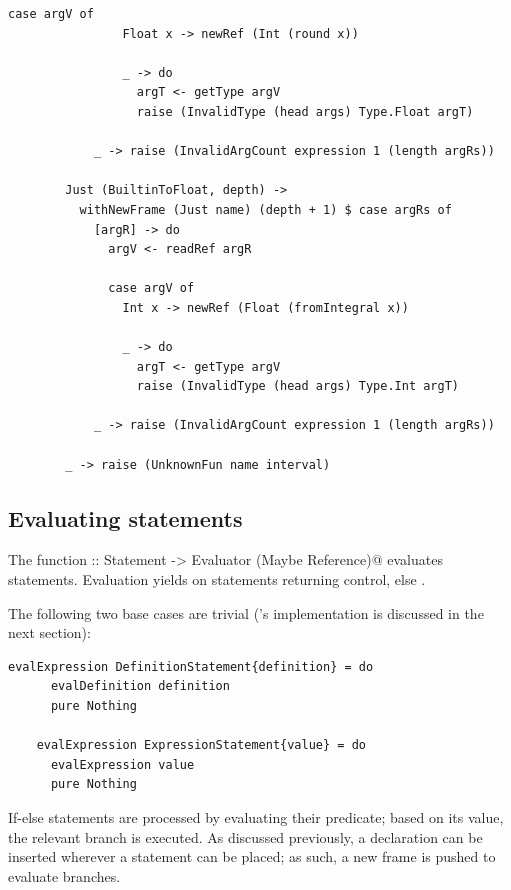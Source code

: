\documentclass[UdineBachThesis,american,11pt]{PhdThesis}
\begin{document}
  \newpage

  \begin{lstlisting}[gobble=4,basicstyle=\ttfamily\small]
              case argV of
                Float x -> newRef (Int (round x))

                _ -> do
                  argT <- getType argV
                  raise (InvalidType (head args) Type.Float argT)

            _ -> raise (InvalidArgCount expression 1 (length argRs))

        Just (BuiltinToFloat, depth) ->
          withNewFrame (Just name) (depth + 1) $ case argRs of
            [argR] -> do
              argV <- readRef argR

              case argV of
                Int x -> newRef (Float (fromIntegral x))

                _ -> do
                  argT <- getType argV
                  raise (InvalidType (head args) Type.Int argT)

            _ -> raise (InvalidArgCount expression 1 (length argRs))

        _ -> raise (UnknownFun name interval)
  \end{lstlisting}

  \subsection{Evaluating statements}

  The function
  \lstinline@evalStatement :: Statement -> Evaluator (Maybe Reference)@
  evaluates statements. Evaluation yields \lstinline@Just@ on statements
  returning control, else \lstinline@Nothing@.

  The following two base cases are trivial (\lstinline@evalDefinitions@'s
  implementation is discussed in the next section):

  \begin{lstlisting}[gobble=4,basicstyle=\ttfamily\small]
    evalExpression DefinitionStatement{definition} = do
      evalDefinition definition
      pure Nothing

    evalExpression ExpressionStatement{value} = do
      evalExpression value
      pure Nothing
  \end{lstlisting}

  If-else statements are processed by evaluating their predicate; based on its
  value, the relevant branch is executed. As discussed previously, a declaration
  can be inserted wherever a statement can be placed; as such, a new frame is
  pushed to evaluate branches.
\end{document}
